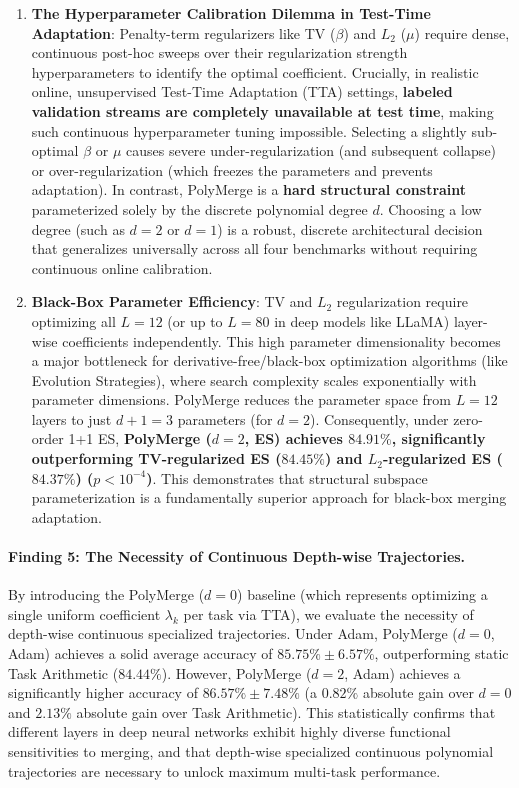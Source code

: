 \begin{enumerate}
    \item \textbf{The Hyperparameter Calibration Dilemma in Test-Time Adaptation}: Penalty-term regularizers like TV ($\beta$) and $L_2$ ($\mu$) require dense, continuous post-hoc sweeps over their regularization strength hyperparameters to identify the optimal coefficient. Crucially, in realistic online, unsupervised Test-Time Adaptation (TTA) settings, \textbf{labeled validation streams are completely unavailable at test time}, making such continuous hyperparameter tuning impossible. Selecting a slightly sub-optimal $\beta$ or $\mu$ causes severe under-regularization (and subsequent collapse) or over-regularization (which freezes the parameters and prevents adaptation). In contrast, PolyMerge is a \textbf{hard structural constraint} parameterized solely by the discrete polynomial degree $d$. Choosing a low degree (such as $d=2$ or $d=1$) is a robust, discrete architectural decision that generalizes universally across all four benchmarks without requiring continuous online calibration.
    
    \item \textbf{Black-Box Parameter Efficiency}: TV and $L_2$ regularization require optimizing all $L=12$ (or up to $L=80$ in deep models like LLaMA) layer-wise coefficients independently. This high parameter dimensionality becomes a major bottleneck for derivative-free/black-box optimization algorithms (like Evolution Strategies), where search complexity scales exponentially with parameter dimensions. PolyMerge reduces the parameter space from $L=12$ layers to just $d+1 = 3$ parameters (for $d=2$). Consequently, under zero-order 1+1 ES, \textbf{PolyMerge ($d=2$, ES) achieves $84.91\%$, significantly outperforming TV-regularized ES ($84.45\%$) and $L_2$-regularized ES ($84.37\%$) ($p < 10^{-4}$)}. This demonstrates that structural subspace parameterization is a fundamentally superior approach for black-box merging adaptation.
\end{enumerate}

\paragraph{Finding 5: The Necessity of Continuous Depth-wise Trajectories.} By introducing the PolyMerge ($d=0$) baseline (which represents optimizing a single uniform coefficient $\lambda_k$ per task via TTA), we evaluate the necessity of depth-wise continuous specialized trajectories. Under Adam, PolyMerge ($d=0$, Adam) achieves a solid average accuracy of $85.75\% \pm 6.57\%$, outperforming static Task Arithmetic ($84.44\%$). However, PolyMerge ($d=2$, Adam) achieves a significantly higher accuracy of $\mathbf{86.57\% \pm 7.48\%}$ (a $0.82\%$ absolute gain over $d=0$ and $2.13\%$ absolute gain over Task Arithmetic). This statistically confirms that different layers in deep neural networks exhibit highly diverse functional sensitivities to merging, and that depth-wise specialized continuous polynomial trajectories are necessary to unlock maximum multi-task performance.

